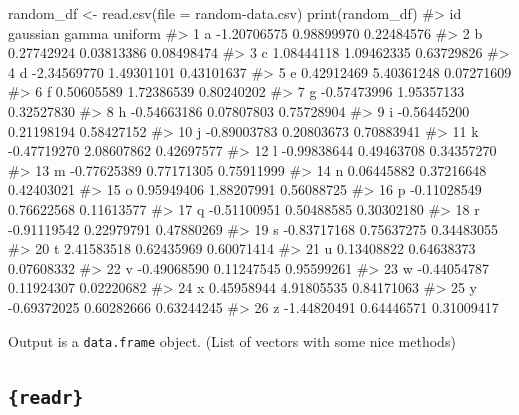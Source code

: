 \documentclass[
  letterpaper,
  DIV=11,
  numbers=noendperiod]{scrreprt}
\newenvironment{Shaded}{\begin{snugshade}}{\end{snugshade}}
\newcommand{\AttributeTok}[1]{\textcolor[rgb]{0.40,0.45,0.13}{#1}}
\newcommand{\CommentTok}[1]{\textcolor[rgb]{0.37,0.37,0.37}{#1}}
\newcommand{\FunctionTok}[1]{\textcolor[rgb]{0.28,0.35,0.67}{#1}}
\newcommand{\NormalTok}[1]{\textcolor[rgb]{0.00,0.23,0.31}{#1}}
\newcommand{\OtherTok}[1]{\textcolor[rgb]{0.00,0.23,0.31}{#1}}
\newcommand{\StringTok}[1]{\textcolor[rgb]{0.13,0.47,0.30}{#1}}
\begin{document}
\begin{Shaded}
\begin{Highlighting}[]
\NormalTok{random\_df }\OtherTok{\textless{}{-}} \FunctionTok{read.csv}\NormalTok{(}\AttributeTok{file =} \StringTok{\textquotesingle{}random{-}data.csv\textquotesingle{}}\NormalTok{)}
\FunctionTok{print}\NormalTok{(random\_df)}
\CommentTok{\#\textgreater{}    id    gaussian      gamma    uniform}
\CommentTok{\#\textgreater{} 1   a {-}1.20706575 0.98899970 0.22484576}
\CommentTok{\#\textgreater{} 2   b  0.27742924 0.03813386 0.08498474}
\CommentTok{\#\textgreater{} 3   c  1.08444118 1.09462335 0.63729826}
\CommentTok{\#\textgreater{} 4   d {-}2.34569770 1.49301101 0.43101637}
\CommentTok{\#\textgreater{} 5   e  0.42912469 5.40361248 0.07271609}
\CommentTok{\#\textgreater{} 6   f  0.50605589 1.72386539 0.80240202}
\CommentTok{\#\textgreater{} 7   g {-}0.57473996 1.95357133 0.32527830}
\CommentTok{\#\textgreater{} 8   h {-}0.54663186 0.07807803 0.75728904}
\CommentTok{\#\textgreater{} 9   i {-}0.56445200 0.21198194 0.58427152}
\CommentTok{\#\textgreater{} 10  j {-}0.89003783 0.20803673 0.70883941}
\CommentTok{\#\textgreater{} 11  k {-}0.47719270 2.08607862 0.42697577}
\CommentTok{\#\textgreater{} 12  l {-}0.99838644 0.49463708 0.34357270}
\CommentTok{\#\textgreater{} 13  m {-}0.77625389 0.77171305 0.75911999}
\CommentTok{\#\textgreater{} 14  n  0.06445882 0.37216648 0.42403021}
\CommentTok{\#\textgreater{} 15  o  0.95949406 1.88207991 0.56088725}
\CommentTok{\#\textgreater{} 16  p {-}0.11028549 0.76622568 0.11613577}
\CommentTok{\#\textgreater{} 17  q {-}0.51100951 0.50488585 0.30302180}
\CommentTok{\#\textgreater{} 18  r {-}0.91119542 0.22979791 0.47880269}
\CommentTok{\#\textgreater{} 19  s {-}0.83717168 0.75637275 0.34483055}
\CommentTok{\#\textgreater{} 20  t  2.41583518 0.62435969 0.60071414}
\CommentTok{\#\textgreater{} 21  u  0.13408822 0.64638373 0.07608332}
\CommentTok{\#\textgreater{} 22  v {-}0.49068590 0.11247545 0.95599261}
\CommentTok{\#\textgreater{} 23  w {-}0.44054787 0.11924307 0.02220682}
\CommentTok{\#\textgreater{} 24  x  0.45958944 4.91805535 0.84171063}
\CommentTok{\#\textgreater{} 25  y {-}0.69372025 0.60282666 0.63244245}
\CommentTok{\#\textgreater{} 26  z {-}1.44820491 0.64446571 0.31009417}
\end{Highlighting}
\end{Shaded}

Output is a \texttt{data.frame} object. (List of vectors with some nice
methods)

\subsection{\texorpdfstring{\texttt{\{readr\}}}{\{readr\}}}\label{readr}
\end{document}
